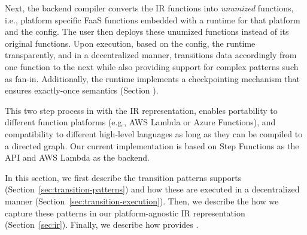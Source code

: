 Next, the \name{} backend compiler converts the IR functions into \textit{unumized} functions, i.e., platform specific FaaS functions embedded with a \name{} runtime for that platform and the \name{} config. The user then deploys these unumized functions instead of its original functions. Upon execution, based on the \name{} config, the \name{} runtime  transparently, and in a decentralized manner, transitions data accordingly from one function to the next while also providing support for complex patterns such as fan-in. Additionally, the
runtime implements a checkpointing mechanism that ensures exactly-once
semantics (Section ).

This two step process in \name{} with the IR representation, enables portability to different function platforms (e.g., AWS Lambda or Azure Functions), and compatibility to different high-level languages as long as they can be compiled to a directed graph. Our current implementation is based on Step Functions as the API and AWS Lambda as the backend.


In this section, we first describe the transition patterns \name{} supports (Section~\ref{sec:transition-patterns}) and how these are executed in a decentralized manner (Section~\ref{sec:transition-execution}). Then, we describe the how we capture these patterns in our platform-agnostic IR representation (Section~\ref{sec:ir}). Finally, we describe how \name{} provides . 

 


%




%




